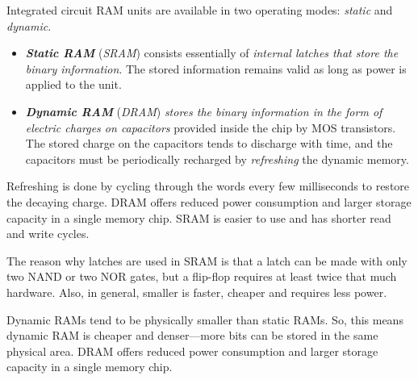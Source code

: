 Integrated circuit RAM units are available in two operating modes: \textit{static} and \textit{dynamic}. 
\begin{itemize}
  \item \textit{\textbf{Static RAM}} (\textit{SRAM}) consists essentially of \textit{internal latches that store the binary information}. The stored information remains valid as long as power is applied to the unit.
  \item \textit{\textbf{Dynamic RAM}} (\textit{DRAM}) \textit{stores the binary information in the form of electric charges on capacitors} provided inside the chip by MOS transistors. The stored charge on the capacitors tends to discharge with time, and the capacitors must be periodically recharged by \textit{refreshing} the dynamic memory.
\end{itemize} 

Refreshing is done by cycling through the words every few milliseconds to restore the decaying charge. DRAM offers reduced power consumption and larger storage capacity in a single memory chip. SRAM is easier to use and has shorter read and write cycles.

The reason why latches are used in SRAM is that a latch can be made with only two NAND or two NOR gates, but a flip-flop requires at least twice that much hardware. Also, in general, smaller is faster, cheaper and requires less power.

Dynamic RAMs tend to be physically smaller than static RAMs. So, this means dynamic RAM is cheaper and denser—more bits can be stored in the same physical area. DRAM offers reduced power consumption and larger storage capacity in a single memory chip.
